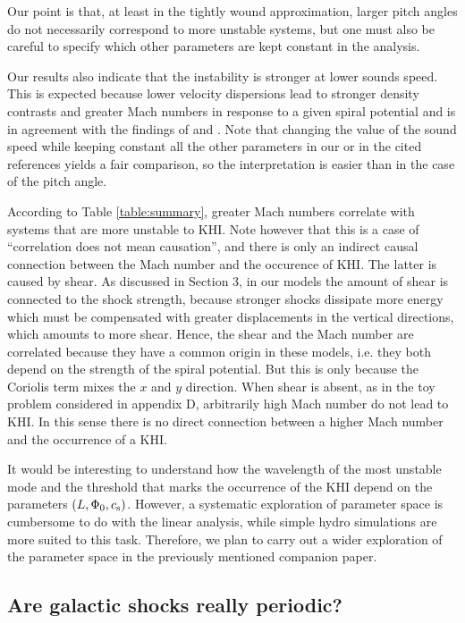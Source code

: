 \documentclass[useAMS,usenatbib]{mn2e}
\begin{document}
Our point is that, at least in the tightly wound approximation, larger pitch angles do not necessarily correspond to more unstable systems, but one must also be careful to specify which other parameters are kept constant in the analysis.

Our results also indicate that the instability is stronger at lower sounds speed. This is expected because lower velocity dispersions lead to stronger density contrasts and greater Mach numbers in response to a given spiral potential and is in agreement with the findings of \cite{WadaKoda2004} and \cite{KimKimKim2014}. Note that changing the value of the sound speed while keeping constant all the other parameters in our or in the cited references yields a fair comparison, so the interpretation is easier than in the case of the pitch angle.

According to Table \ref{table:summary}, greater Mach numbers correlate with systems that are more unstable to KHI. Note however that this is a case of ``correlation does not mean causation'', and there is only an indirect causal connection between the Mach number and the occurence of KHI. The latter is caused by shear. As discussed in Section 3, in our models the amount of shear is connected to the shock strength, because stronger shocks dissipate more energy which must be compensated with greater displacements in the vertical directions, which amounts to more shear. Hence, the shear and the Mach number are correlated because they have a common origin in these models, i.e. they both depend on the strength of the spiral potential. But this is only because the Coriolis term mixes the $x$ and $y$ direction. When shear is absent, as in the toy problem considered in appendix D, arbitrarily high Mach number do not lead to KHI. In this sense there is no direct connection between a higher Mach number and the occurrence of a KHI.

It would be interesting to understand how the wavelength of the most unstable mode and the threshold that marks the occurrence of the KHI depend on the parameters $(L,\Phi_0,c_{\rm s})$. However, a systematic exploration of parameter space is cumbersome to do with the linear analysis, while simple hydro simulations are more suited to this task. Therefore, we plan to carry out a wider exploration of the parameter space in the previously mentioned companion paper. 

\subsection{Are galactic shocks really periodic?} \label{sec:reallyperiodic}
\end{document}
